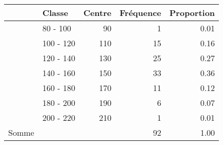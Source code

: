 \documentclass{standalone}
\begin{document}
  
{\small
\begin{tabular}{rlrrr}
  \hline
 & Classe & Centre & Fréquence & Proportion \\ 
  \hline
   & 80 - 100 &  90 &   1 & 0.01  \\ 
   & 100 - 120 & 110 &  15 & 0.16 \\ 
   & 120 - 140 & 130 &  25 & 0.27 \\ 
   & 140 - 160 & 150 &  33 & 0.36 \\ 
   & 160 - 180 & 170 &  11 & 0.12 \\ 
   & 180 - 200 & 190 &   6 & 0.07 \\ 
   & 200 - 220 & 210 &   1 & 0.01 \\ 
   \hline
  Somme &  &  &  92 & 1.00  \\ 
   \hline
\end{tabular}
}
\end{document}
